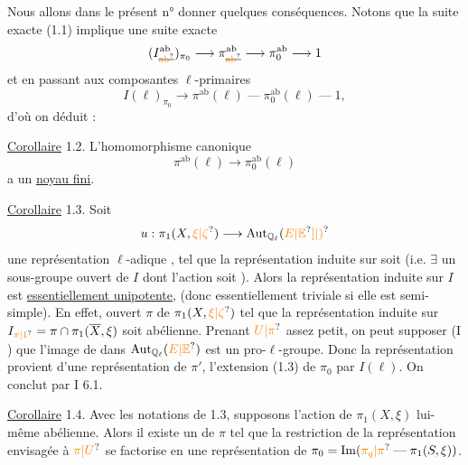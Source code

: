 Nous allons dans le présent n° donner quelques conséquences. Notons que la suite exacte (1.1) implique une suite exacte
\[
(I^{\mathrm{ab}}_{\deleted{\unsure{\mathrm{ab}}}})_{\pi_0}\longrightarrow\pi^{\mathrm{ab}}_{\deleted{\unsure{\mathrm{ab}}}}\longrightarrow\pi_0^{\mathrm{ab}}\longrightarrow1
\]
 et en passant aux composantes $\ell$-primaires
\[
I(\ell)_{\pi_0}\longrightarrow\pi^{\mathrm{ab}}(\ell)\mathrel{\text{---}}\pi_0^{\mathrm{ab}}(\ell)\mathrel{\text{---}}1,
\]
d'où on déduit :

\uline{Corollaire} 1.2. L'homomorphisme  canonique
\[
\pi^{\mathrm{ab}}(\ell)\longrightarrow\pi_0^{\mathrm{ab}}(\ell)
\]
 a un \uline{noyau fini}.


\uline{Corollaire} 1.3. Soit
\[
u:\pi_1(X,\unsure{\xi|\zeta})\longrightarrow\operatorname{Aut}_{\mathbb{Q}_\ell}(\unsure{E|\mathbb{E}}\unsure{]|)}
\]
une représentation $\ell$-adique , tel que la représentation induite sur   soit   (i.e. $\exists$ un sous-groupe ouvert de $I$ dont l'action soit  ). Alors la représentation induite sur $I$ est \uline{essentiellement unipotente},  (donc essentiellement triviale si elle est semi-simple).
En effet,   ouvert $\pi$ de $\pi_1(X,\unsure{\xi|\zeta})$ tel que la représentation induite sur $I_{\unsure{\pi|1}}=\pi\cap\pi_1(\overline X,\xi)$ soit abélienne. Prenant $\unsure{U|\pi}$ assez petit, on peut supposer (I \quad) que  l'image de \deleted{\unsure{$\pi$}} dans $\operatorname{Aut}_{\mathbb{Q}_\ell}(\unsure{E|\mathbb{E}})$ est un pro-$\ell$-groupe. Donc la représentation  provient d'une représentation de $\pi'$,  l'extension (1.3) de $\pi_0$ par $I(\ell)$. On conclut par I 6.1.

\uline{Corollaire} 1.4. Avec les notations de 1.3, supposons l'action de $\pi_1(X,\xi)$ lui-même   abélienne. Alors    il existe un    de $\pi$ tel que la restriction de la représentation envisagée à $\unsure{\pi|U}$  se factorise en une représentation de  $\pi_0=\operatorname{Im}(\unsure{\pi_q|\pi}\mathrel{\text{---}}\pi_1(S,\xi))$.

